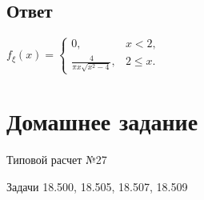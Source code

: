 \subsection*{Ответ}
$
f_\xi(x)
= \left \{
\begin{array}{ll}
    0,                              & x < 2 ,   \\
    \frac{4}{\pi x \sqrt{x^2 - 4}}, & 2 \le x .
\end{array}
\right .
$


\section*{Домашнее задание}
Типовой расчет №27

Задачи 18.500, 18.505, 18.507, 18.509

